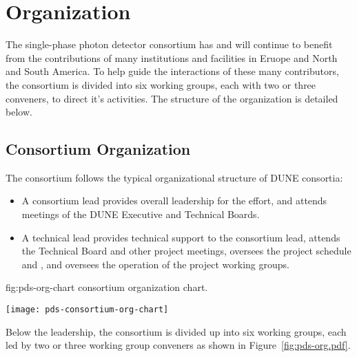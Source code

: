 \section{Organization}
\label{sec:fdsp-pd-org}

The single-phase photon detector consortium has and will continue to benefit from the contributions of many institutions and facilities in Eruope and North and South America.  To help guide the interactions of these many contributors, the consortium is divided into six working groups, each with two or three conveners, to direct it's activities.   The structure of the organization is detailed below.

\subsection{Consortium Organization}
\label{sec:fdsp-pd-org-consortium}

The \single {} consortium follows the typical organizational structure of DUNE consortia:
\begin{itemize}
\item A consortium lead
provides overall leadership for the effort, and attends meetings of the DUNE Executive and Technical Boards.
\item A technical lead 
provides technical support to the consortium lead, attends the Technical Board and other project meetings, oversees the project schedule and , and oversees the operation of the project working groups.  
\end{itemize}

\begin{dunefigure}{fig:pds-org-chart}
{ consortium organization chart.}

	\texttt{[image: pds-consortium-org-chart]}
	
\end{dunefigure} 



Below the leadership, the consortium is divided up into six working groups, each led by two or three working group conveners as shown in Figure~\ref{fig:pds-org.pdf}. 



